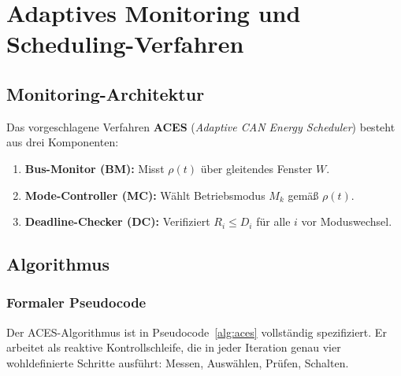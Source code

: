﻿\documentclass[a4paper,12pt]{article}
\theoremstyle{definition}
\begin{document}
\section{Adaptives Monitoring und Scheduling-Verfahren}

\subsection{Monitoring-Architektur}

Das vorgeschlagene Verfahren \textbf{ACES} (\emph{Adaptive CAN Energy Scheduler})
besteht aus drei Komponenten:

\begin{enumerate}
    \item \textbf{Bus-Monitor (BM):} Misst $\rho(t)$ \"{u}ber gleitendes Fenster $W$.
    \item \textbf{Mode-Controller (MC):} W\"{a}hlt Betriebsmodus $M_k$ gem\"{a}\ss{} $\rho(t)$.
    \item \textbf{Deadline-Checker (DC):} Verifiziert $R_i \leq D_i$ f\"{u}r alle $i$ vor Moduswechsel.
\end{enumerate}

\subsection{Algorithmus}

\subsubsection{Formaler Pseudocode}

Der ACES-Algorithmus ist in Pseudocode~\ref{alg:aces} vollst\"{a}ndig spezifiziert.
Er arbeitet als reaktive Kontrollschleife, die in jeder Iteration genau vier
wohldefinierte Schritte ausf\"{u}hrt: Messen, Ausw\"{a}hlen, Pr\"{u}fen, Schalten.
\end{document}
